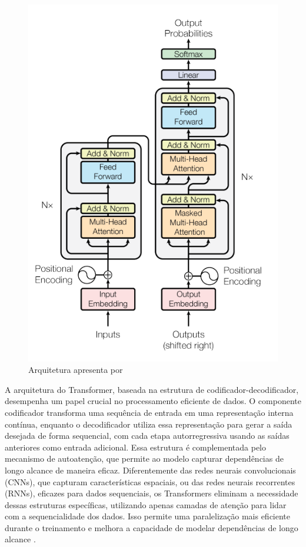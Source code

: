 \begin{figure}[H]
   \centering
   \includegraphics[width=0.8\linewidth]{capitulos/figuras/transformerarquitetura.png}
   \caption{Arquitetura apresenta por \textcite{https://doi.org/10.48550/arxiv.1706.03762}}
   \label{fig:arquitetura}
\end{figure}

A arquitetura do Transformer, baseada na estrutura de codificador-decodificador, desempenha um papel crucial no processamento eficiente de dados. O componente codificador transforma uma sequência de entrada em uma representação interna contínua, enquanto o decodificador utiliza essa representação para gerar a saída desejada de forma sequencial, com cada etapa autorregressiva usando as saídas anteriores como entrada adicional. Essa estrutura é complementada pelo mecanismo de autoatenção, que permite ao modelo capturar dependências de longo alcance de maneira eficaz. Diferentemente das redes neurais convolucionais (CNNs), que capturam características espaciais, ou das redes neurais recorrentes (RNNs), eficazes para dados sequenciais, os Transformers eliminam a necessidade dessas estruturas específicas, utilizando apenas camadas de atenção para lidar com a sequencialidade dos dados. Isso permite uma paralelização mais eficiente durante o treinamento e melhora a capacidade de modelar dependências de longo alcance \cite{THIRUNAVUKARASU2024100648}. 

